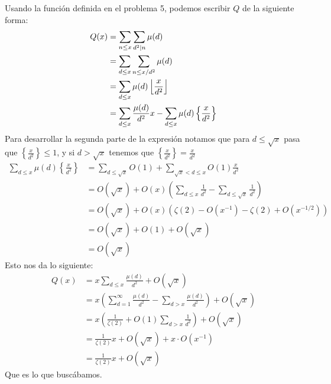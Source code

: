 \begin{sol}
    Usando la función definida en el problema 5, podemos escribir $Q$ de la siguiente forma:
    \begin{align*}
        Q(x)&=\sum_{n\leq x}\sum_{d^2|n}\mu(d)\\
        &=\sum_{d\leq x}\sum_{n\leq x/d^2}\mu(d)\\
        &=\sum_{d\leq x}\mu(d)\left\lfloor\frac{x}{d^2}\right\rfloor\\
        &=\sum_{d\leq x}\frac{\mu(d)}{d^2}x-\sum_{d\leq x}\mu(d)\left\{\frac{x}{d^2}\right\}\\
    \end{align*}
    Para desarrollar la segunda parte de la expresión notamos que para $d\leq\sqrt{x}$ pasa que $\left\{\frac{x}{d^2}\right\}\leq 1$, y si $d>\sqrt{x}$ tenemos que $\left\{\frac{x}{d^2}\right\}=\frac{x}{d^2}$
    \begin{align*}
        \sum_{d\leq x}\mu(d)\left\{\frac{x}{d^2}\right\}&=\sum_{d\leq\sqrt{x}}O(1)+\sum_{\sqrt{x}<d\leq x}O(1)\frac{x}{d^2}\\
        &=O(\sqrt{x})+O(x)\left(\sum_{d\leq x}\frac{1}{d^2}-\sum_{d\leq\sqrt{x}}\frac{1}{d^2}\right)\\
        &=O(\sqrt{x})+O(x)\left(\zeta(2) - O(x^{-1}) - \zeta(2) + O(x^{-1/2})\right)\\
        &=O(\sqrt{x})+O(1)+O(\sqrt{x})\\
        &=O(\sqrt{x})
    \end{align*}
    Esto nos da lo siguiente:
    \begin{align*}
        Q(x)&=x\sum_{d\leq x}\frac{\mu(d)}{d^2}+O(\sqrt{x})\\
        &=x\left(\sum_{d=1}^\infty\frac{\mu(d)}{d^2}-\sum_{d>x}\frac{\mu(d)}{d^2}\right)+O(\sqrt{x})\\
        &=x\left(\frac{1}{\zeta(2)}+O(1)\sum_{d>x}\frac{1}{d^2}\right)+O(\sqrt{x})\\
        &=\frac{1}{\zeta(2)}x+O(\sqrt{x})+x\cdot O(x^{-1})\\
        &=\frac{1}{\zeta(2)}x+O(\sqrt{x})
    \end{align*}
    Que es lo que buscábamos.
\end{sol}

